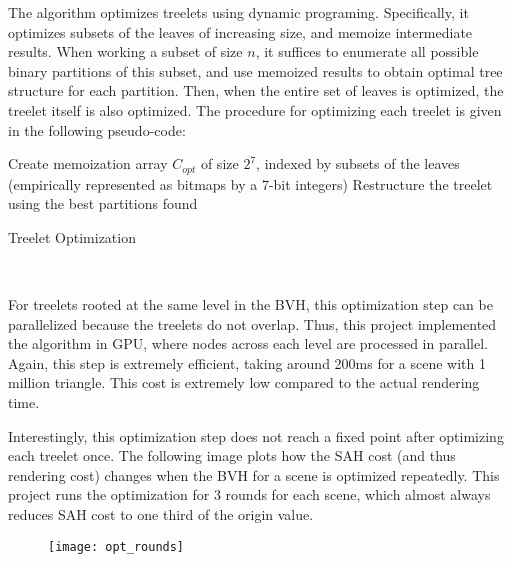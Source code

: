 The algorithm optimizes treelets using dynamic programing. Specifically, it optimizes subsets of the leaves of increasing size, and memoize intermediate results. When working a subset of size $n$, it suffices to enumerate all possible binary partitions of this subset, and use memoized results to obtain optimal tree structure for each partition. Then, when the entire set of leaves is optimized, the treelet itself is also optimized. The procedure for optimizing each treelet is given in the following pseudo-code:

\begin{algorithm}[H]
    \label{algo optimize treelet}
    Create memoization array $C_{opt}$ of size $2^7$, indexed by subsets of the leaves (empirically represented as bitmaps by a 7-bit integers)\;
    Restructure the treelet using the best partitions found\;
    \caption{Treelet Optimization}
\end{algorithm} 

~

For treelets rooted at the same level in the BVH, this optimization step can be parallelized because the treelets do not overlap. Thus, this project implemented the algorithm in GPU, where nodes across each level are processed in parallel. Again, this step is extremely efficient, taking around 200ms for a scene with 1 million triangle. This cost is extremely low compared to the actual rendering time.

\thispagestyle{empty}
\enlargethispage{5\baselineskip}

Interestingly, this optimization step does not reach a fixed point after optimizing each treelet once. The following image plots how the SAH cost (and thus rendering cost) changes when the BVH for a scene is optimized repeatedly. This project runs the optimization for 3 rounds for each scene, which almost always reduces SAH cost to one third of the origin value.

\begin{figure}[H]
    \centering
    \texttt{[image: opt\_rounds]}
\end{figure}

